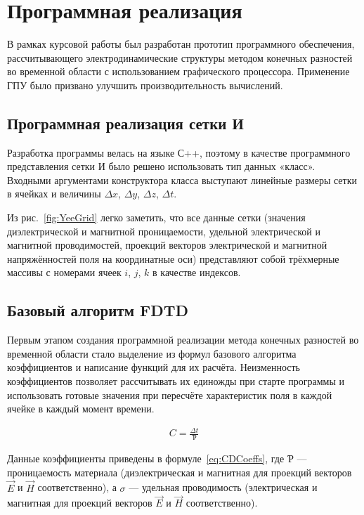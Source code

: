\section{Программная реализация}

В рамках курсовой работы был разработан прототип программного обеспечения, рассчитывающего электродинамические структуры методом конечных разностей во временной области с использованием графического процессора. Применение ГПУ было призвано улучшить производительность вычислений.

\subsection{Программная реализация сетки И}

Разработка программы велась на языке С++, поэтому в качестве программного представления сетки И было решено использовать тип данных «класс». Входными аргументами конструктора класса выступают линейные размеры сетки в ячейках и величины $ \Delta{x} $, $ \Delta{y} $, $ \Delta{z} $, $ \Delta{t} $.

Из рис.~\ref{fig:YeeGrid} легко заметить, что все данные сетки (значения диэлектрической и магнитной проницаемости, удельной электрической и магнитной проводимостей, проекций векторов электрической и магнитной напряжённостей поля на координатные оси) представляют собой трёхмерные массивы с номерами ячеек $ i $, $ j $, $ k $ в качестве индексов.

\subsection{Базовый алгоритм FDTD}

Первым этапом создания программной реализации метода конечных разностей во временной области стало выделение из формул базового алгоритма коэффициентов и написание функций для их расчёта. Неизменность коэффициентов позволяет рассчитывать их единожды при старте программы и использовать готовые значения при пересчёте характеристик поля в каждой ячейке в каждый момент времени.

\begin{align}
\label{eq:CDCoeffs}
C=\frac{\Delta{t}}{Ƥ}
\end{align}

Данные коэффициенты приведены в формуле~\eqref{eq:CDCoeffs}, где Ƥ --- проницаемость материала (диэлектрическая и магнитная для проекций векторов $\vec{E}$  и $\vec{H}$ соответственно), а $\sigma$ --- удельная проводимость (электрическая и магнитная для проекций векторов $\vec{E}$  и $\vec{H}$ соответственно).

